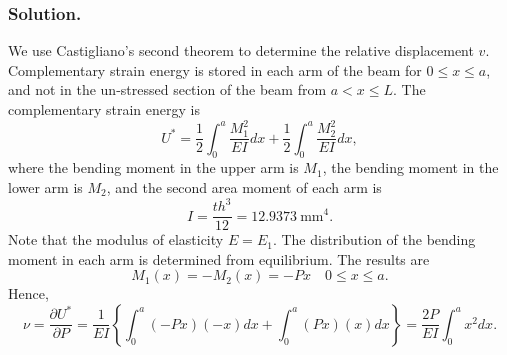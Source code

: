 \documentclass{AeroStructure-ERJohnson}
\begin{document}
\begin{example*}
\subsubsection{Solution.} We use Castigliano's second theorem to determine the relative displacement $v$. Complementary strain energy is stored in each arm of the beam for $0 \leq x \leq a$, and not in the un-stressed section of the beam from $a<x \leq L$. The complementary strain energy is
\begin{equation}
U^{*}=\frac{1}{2} \int_{0}^{a} \frac{M_{1}^{2}}{E I} d x+\frac{1}{2} \int_{0}^{a} \frac{M_{2}^{2}}{E I} d x, \label{eq13.3.a}\tag{a}
\end{equation}
where the bending moment in the upper arm is $M_{1}$, the bending moment in the lower arm is $M_{2}$, and the second area moment of each arm is
\begin{equation}
I=\frac{t h^{3}}{12}=12.9373 \mathrm{~mm}^{4}. \label{eq13.3.b}\tag{b}
\end{equation}
Note that the modulus of elasticity $E=E_{1}$. The distribution of the bending moment in each arm is determined from equilibrium. The results are
\begin{equation}
M_{1}(x)=-M_{2}(x)=-P x \quad 0 \leq x \leq a. \label{eq13.3.c}\tag{c}
\end{equation}
Hence,
\begin{equation}
\nu=\frac{\partial U^{*}}{\partial P}=\frac{1}{E I}\left\{\int_{0}^{a}(-P x)(-x) d x+\int_{0}^{a}(P x)(x) d x\right\}=\frac{2 P}{E I} \int_{0}^{a} x^{2} d x. \label{eq13.3.d}\tag{d}
\end{equation}

\vspace*{-1pc}\pagebreak


\end{example*}
\end{document}
